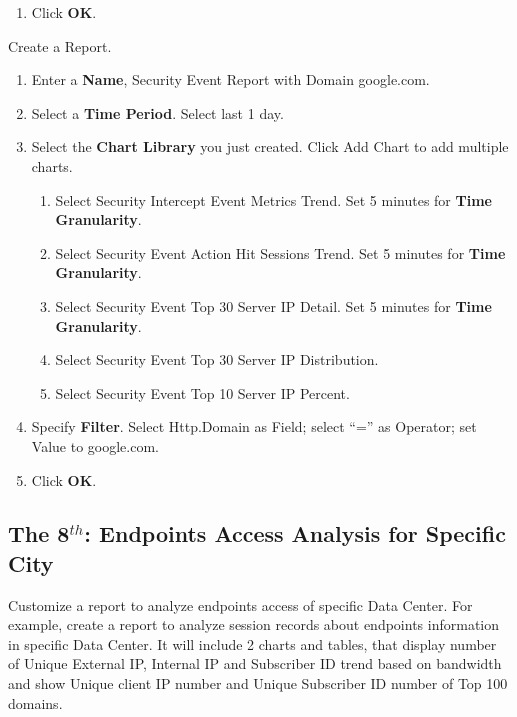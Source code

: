 \begin{description}
\begin{enumerate}
\begin{enumerate}
            \item 	Click \textbf{OK}.
        \end{enumerate}
    \end{enumerate}
    \item[STEP 3.]	Create a Report. 
    \begin{enumerate}
        \item Enter a \textbf{Name}, Security Event Report with Domain google.com. 
        \item Select a \textbf{Time Period}. Select last 1 day.
        \item Select the \textbf{Chart Library} you just created. Click Add Chart to add multiple charts.
        \begin{enumerate}
            \item 	Select Security Intercept Event Metrics Trend. Set 5 minutes for \textbf{Time Granularity}.
            \item 	Select Security Event Action Hit Sessions Trend. Set 5 minutes for \textbf{Time Granularity}.
            \item 	Select Security Event Top 30 Server IP Detail. Set 5 minutes for \textbf{Time Granularity}.
            \item 	Select Security Event Top 30 Server IP Distribution.
            \item 	Select Security Event Top 10 Server IP Percent.
        \end{enumerate}
        \item Specify \textbf{Filter}. Select Http.Domain as Field; select “=” as Operator; set Value to google.com.  
        \item Click \textbf{OK}.
    \end{enumerate}
\end{description}

\subsection*{\hypertarget{link:The 8th: Endpoints Access Analysis for Specific City}{The 8$^{th}$: Endpoints Access Analysis for Specific City}}
\label{sec:appendix_f:report:8th}

Customize a report to analyze endpoints access of specific Data Center. For example, create a report to analyze session records about endpoints information in specific Data Center. It will include 2 charts and tables, that display number of Unique External IP, Internal IP and Subscriber ID trend based on bandwidth and show Unique client IP number and Unique Subscriber ID number of Top 100 domains.


